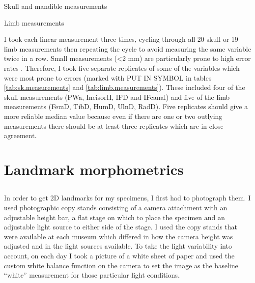 
\begin{table}[h]
\caption[Description of the skull and mandible measurements]
		{Skull and mandible measurements}%

\label{tab:sk.measurements}
\end{table}

\begin{table}[h]
\caption[Description of the limb measurements]
		{Limb measurements} %

\label{tab:limb.measurements}
\end{table}


I took each linear measurement three times, cycling through all 20 skull or 19 limb measurements then repeating the cycle to avoid measuring the same variable twice in a row. Small measurements (<2 mm) are particularly prone to high error rates \citep{Cardini2008}. Therefore, I took five separate replicates of some of the variables which were most prone to errors (marked with PUT IN SYMBOL in tables \ref{tab:sk.measurements} and \ref{tab:limb.measurements}). These included four of the skull measurements (PWa, IncisorH, IFD and IFcanal) and five of the limb measurements (FemD, TibD, HumD, UlnD, RadD). 
Five replicates should give a more reliable median value because even if there are one or two outlying measurements there should be at least three replicates which are in close agreement.

\section{Landmark morphometrics}
\subsection{}
In order to get 2D landmarks for my specimens, I first had to photograph them. I used photographic copy stands consisting of a camera attachment with an adjustable height bar, a flat stage on which to place the specimen and an adjustable light source to either side of the stage. I used the copy stands that were available at each museum which differed in how the camera height was adjusted and in the light sources available.
To take the light variability into account, on each day I took a picture of a white sheet of paper and used the custom white balance function on the camera to set the image as the baseline “white” measurement for those particular light conditions.

